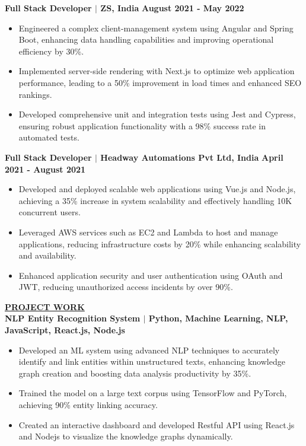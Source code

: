 \documentclass{article}
\begin{document}
\vspace{2mm} 

\noindent \textbf{Full Stack Developer $\mid$ ZS, India} \hfill \textbf{August 2021 - May 2022}
\begin{itemize}[noitemsep,nolistsep,leftmargin=*]
\item {\small Engineered a complex client-management system using Angular and Spring Boot, enhancing data handling capabilities and improving operational efficiency by 30\%.}
\item {\small Implemented server-side rendering with Next.js to optimize web application performance, leading to a 50\% improvement in load times and enhanced SEO rankings.}
\item {\small Developed comprehensive unit and integration tests using Jest and Cypress, ensuring robust application functionality with a 98\% success rate in automated tests.}
\end{itemize}

\vspace{2mm} 

\noindent \textbf{Full Stack Developer $\mid$ Headway Automations Pvt Ltd, India} \hfill \textbf{April 2021 - August 2021}
\begin{itemize}[noitemsep,nolistsep,leftmargin=*]
\item {\small Developed and deployed scalable web applications using Vue.js and Node.js, achieving a 35\% increase in system scalability and effectively handling 10K concurrent users.}
\item {\small Leveraged AWS services such as EC2 and Lambda to host and manage applications, reducing infrastructure costs by 20\% while enhancing scalability and availability.}
\item {\small Enhanced application security and user authentication using OAuth and JWT, reducing unauthorized access incidents by over 90\%.}\\
\end{itemize}

\noindent \textbf{\underline{PROJECT WORK}} \\
\noindent \textbf{NLP Entity Recognition System $\mid$ {\small Python, Machine Learning, NLP, JavaScript, React.js, Node.js}}
\begin{itemize}[noitemsep,nolistsep,leftmargin=*]
\item {\small Developed an ML system using advanced NLP techniques to accurately identify and link entities within unstructured texts, enhancing knowledge graph creation and boosting data analysis productivity by 35\%.}
\item {\small Trained the model on a large text corpus using TensorFlow and PyTorch, achieving 90\% entity linking accuracy.}
\item {\small Created an interactive dashboard and developed Restful API using React.js and Nodejs to visualize the knowledge graphs dynamically.}
\end{itemize}
\end{document}
